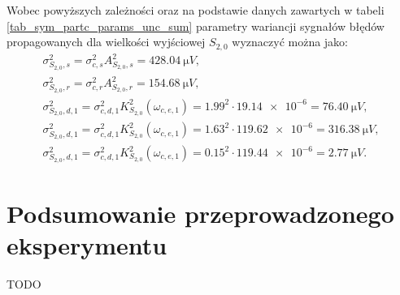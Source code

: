 Wobec powyższych zależności oraz na podstawie danych zawartych w tabeli \ref{tab_sym_partc_params_unc_sum} parametry wariancji sygnałów błędów propagowanych dla wielkości wyjściowej $S_{2,0}$ wyznaczyć można jako:
\begin{gather}
\sigma_{S_{2,0},s}^{2} = \sigma_{c,s}^{2} A_{S_{2,0},s}^{2} = \qty{428.04}{\micro V} \label{eqn_sym_partd_output_var_stat_S_2_0}, \\
\sigma_{S_{2,0},r}^{2} = \sigma_{c,r}^{2} A_{S_{2,0},r}^{2} = \qty{154.68}{\micro V} \label{eqn_sym_partd_output_var_rand_S_2_0}, \\
\sigma_{S_{2,0},d,1}^{2} = \sigma_{c,d,1}^{2} K_{S_{2,0}}^{2} \left( \omega_{c,e,1} \right) = {1.99}^{2} \cdot \num{19.14e-6} = \qty{76.40}{\micro V} \label{eqn_sym_partd_output_var_dyn_1_S_2_0}, \\
\sigma_{S_{2,0},d,1}^{2} = \sigma_{c,d,1}^{2} K_{S_{2,0}}^{2}\left(\omega_{c,e,1}\right) = {1.63}^{2} \cdot \num{119.62e-6} = \qty{316.38}{\micro V} \label{eqn_sym_partd_output_var_dyn_2_S_2_0}, \\
\sigma_{S_{2,0},d,1}^{2} = \sigma_{c,d,1}^{2} K_{S_{2,0}}^{2} \left( \omega_{c,e,1} \right) = {0.15}^{2} \cdot \num{119.44e-6} = \qty{2.77}{\micro V} \label{eqn_sym_partd_output_var_dyn_3_S_2_0}.
\end{gather}

\section{Podsumowanie przeprowadzonego eksperymentu}

TODO

